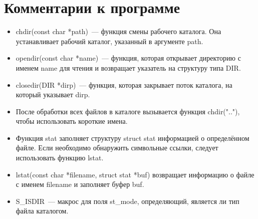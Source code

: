 
\section{Комментарии к программе}
\begin{itemize}
    \item chdir(const char *path)~--- функция смены рабочего каталога. Она устанавливает рабочий каталог, указанный в аргументе path.
    \item opendir(const char *name)~--- функция, которая открывает директорию с именем name для чтения и возвращает указатель на структуру типа DIR.
    \item closedir(DIR *dirp)~--- функция, которая закрывает поток каталога, на который указывает dirp.
    \item После обработки всех файлов в каталоге вызывается функция chdir(".."), чтобы использовать короткие имена.
    \item Функция stat заполняет структуру struct stat информацией о определённом файле. Если необходимо обнаружить символьные ссылки, следует использовать функцию lstat.
    \item lstat(const char *filename, struct stat *buf) возвращает информацию о файле с именем filename и заполняет буфер buf.
    \item S\_ISDIR~--- макрос для поля st\_mode, определяющий, является ли тип файла каталогом.
\end{itemize}
